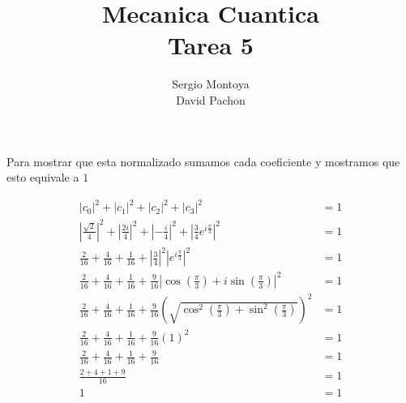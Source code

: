\documentclass{report}
\title{\Huge{Mecanica Cuantica}\\Tarea 5}
\author{\huge{Sergio Montoya}\\ \huge{David Pachon}}
\date{}
\begin{document}
\maketitle
\newpage%
\tableofcontents
\pagebreak

\chapter{}

\chapter{}

\section{}

Para mostrar que esta normalizado sumamos cada coeficiente y mostramos que esto equivale a $1$

\begin{align*}
  \left| c_0 \right|^2 +
  \left| c_1 \right|^2 +
  \left| c_2 \right|^2 +
  \left| c_3 \right|^2 &= 1\\
  \left| \frac{\sqrt{2}}{4} \right|^2 +
  \left| \frac{2i}{4} \right|^2 +
  \left| - \frac{i}{4} \right|^2 +
  \left| \frac{3}{4}e^{i \frac{\pi}{3}} \right|^2 &= 1\\
  \frac{2}{16} +
  \frac{4}{16} +
  \frac{1}{16} +
  \left| \frac{3}{4}\right|^2 \left|e^{i \frac{\pi}{3}} \right|^2 &= 1\\
  \frac{2}{16} +
  \frac{4}{16} +
  \frac{1}{16} +
  \frac{9}{16}\left|\cos\left(\frac{\pi}{3}\right) + i\sin\left(\frac{\pi}{3}\right)\right|^2 &= 1\\
  \frac{2}{16} +
  \frac{4}{16} +
  \frac{1}{16} +
  \frac{9}{16}\left(\sqrt{\cos^2\left(\frac{\pi}{3}\right) + \sin^2\left(\frac{\pi}{3}\right)}\right)^2 &= 1\\
  \frac{2}{16} +
  \frac{4}{16} +
  \frac{1}{16} +
  \frac{9}{16}\left( 1 \right)^2 &= 1\\
  \frac{2}{16} +
  \frac{4}{16} +
  \frac{1}{16} +
  \frac{9}{16} &= 1\\
  \frac{2 + 4 + 1 + 9}{16} &= 1\\
  1 &= 1\\
\end{align*}

\section{}
\end{document}
